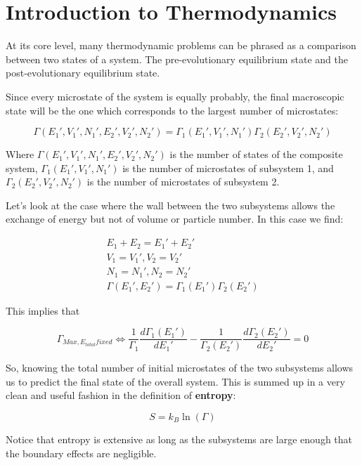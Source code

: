 \documentclass{article}
\newcommand{\dif}[2]{\frac{d#1}{d#2}}
\newcommand{\bltz}{k_{B}}
\begin{document}
\section{Introduction to Thermodynamics}

At its core level, many thermodynamic problems can be phrased as a comparison between two states of a system.  The pre-evolutionary equilibrium state and the post-evolutionary equilibrium state.


Since every microstate of the system is equally probably, the final macroscopic state will be the one which corresponds to the largest number of microstates:

$$\Gamma(E_{1}',V_{1}',N_{1}',E_{2}',V_{2}',N_{2}')=\Gamma_{1}(E_{1}',V_{1}',N_{1}')\Gamma_{2}(E_{2}',V_{2}',N_{2}') $$

Where $\Gamma(E_{1}',V_{1}',N_{1}',E_{2}',V_{2}',N_{2}')$ is the number of states of the composite system, $\Gamma_{1}(E_{1}',V_{1}',N_{1}')$ is the number of microstates of subsystem 1, and $\Gamma_{2}(E_{2}',V_{2}',N_{2}')$ is the number of microstates of subsystem 2.

Let's look at the case where the wall between the two subsystems allows the exchange of energy but not of volume or particle number.  In this case we find:

\begin{multline}
E_{1}+E_{2}=E_{1}'+E_{2}' \\
V_{1}=V_{1}', V_{2}=V_{2}' \\
N_{1}=N_{1}', N_{2}=N_{2}' \\
\Gamma(E_{1}',E_{2}')=\Gamma_{1}(E_{1}')\Gamma_{2}(E_{2}')
\end{multline}

This implies that

$$\Gamma_{Max, E_{total} fixed}\Leftrightarrow\frac{1}{\Gamma_{1}}\dif{\Gamma_{1}(E_{1}')}{E_{1}'}-\frac{1}{\Gamma_{2}(E_{2}')}\dif{\Gamma_{2}(E_{2}')}{E_{2}'}=0$$  

So, knowing the total number of initial microstates of the two subsystems allows us to predict the final state of the overall system.  This is summed up in a very clean and useful fashion in the definition of \textbf{entropy}:

$$S=\bltz\ln(\Gamma)$$
   
Notice that entropy is extensive as long as the subsystems are large enough that the boundary effects are negligible.
\end{document}

